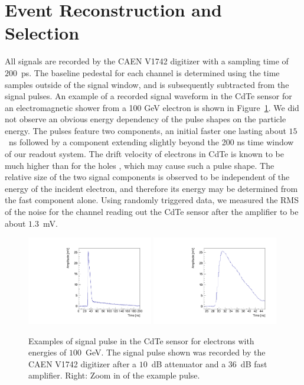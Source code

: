 
\section{Event Reconstruction and Selection }
\label{sec:reco}

All signals are recorded by the CAEN V1742 digitizer with a sampling time of $200$~ps.
The baseline pedestal for each channel is determined using the time samples outside of
the signal window, and is subsequently subtracted from the signal pulses. An example of a recorded
signal waveform in the CdTe sensor for an electromagnetic shower from a 100 GeV electron is shown 
in Figure~\ref{fig:Pulses}. We did not observe an obvious energy dependency of the pulse shapes on 
the particle energy. The pulses feature two components, an initial faster one lasting about $15$~ns 
followed by a component extending slightly beyond the 200 ns time window of our readout system. 
The drift velocity of electrons in CdTe is known to be much higher than for the 
holes \cite{scpulses}, which may cause such a pulse shape. The relative size of 
the two signal components is observed to be independent of the energy of the 
incident electron, and therefore its energy may be determined from the fast 
component alone. Using randomly triggered data, we measured the RMS of 
the noise for the channel reading out the CdTe sensor after the amplifier to be about $1.3$~mV. 

\begin{figure}[htbp] 
\centering
\includegraphics[width=0.49\textwidth]{figures/CdTe_pulse.pdf}
\includegraphics[width=0.49\textwidth]{figures/CdTe_pulseZ.pdf} 
\caption{Examples of signal pulse in the CdTe sensor for electrons with energies of $100$~GeV. 
The signal pulse shown was recorded by the CAEN V1742 digitizer after a $10$~dB 
attenuator and a $36$~dB fast amplifier. Right: Zoom in of the example pulse. } 
\label{fig:Pulses} 
\end{figure} 

